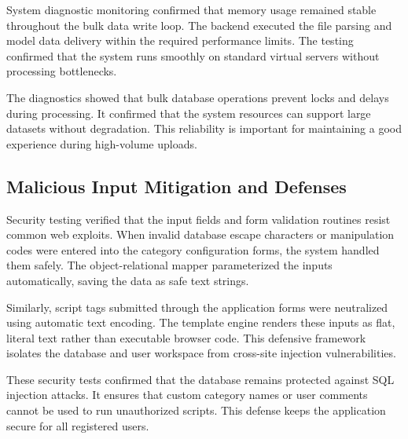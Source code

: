 System diagnostic monitoring confirmed that memory usage remained stable throughout the bulk data write loop. The backend executed the file parsing and model data delivery within the required performance limits. The testing confirmed that the system runs smoothly on standard virtual servers without processing bottlenecks.

The diagnostics showed that bulk database operations prevent locks and delays during processing. It confirmed that the system resources can support large datasets without degradation. This reliability is important for maintaining a good experience during high-volume uploads.

\subsection{Malicious Input Mitigation and Defenses}
Security testing verified that the input fields and form validation routines resist common web exploits. When invalid database escape characters or manipulation codes were entered into the category configuration forms, the system handled them safely. The object-relational mapper parameterized the inputs automatically, saving the data as safe text strings.

Similarly, script tags submitted through the application forms were neutralized using automatic text encoding. The template engine renders these inputs as flat, literal text rather than executable browser code. This defensive framework isolates the database and user workspace from cross-site injection vulnerabilities.

These security tests confirmed that the database remains protected against SQL injection attacks. It ensures that custom category names or user comments cannot be used to run unauthorized scripts. This defense keeps the application secure for all registered users.
